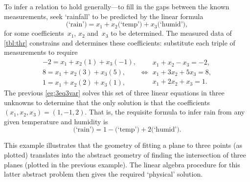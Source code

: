 \begin{example}
\begin{solution} 
To infer a relation to hold generally---to fill in the gaps between the known measurements, seek `rainfall' to be predicted by the linear formula
\begin{equation*}
\text{(`rain')}=x_1+x_2\text{(`temp')}+x_3\text{(`humid')},
\end{equation*}
for some coefficients~\(x_1\), \(x_2\) and~\(x_3\) to be determined.
The measured data of \autoref{tbl:thr} constrains and determines these coefficients:
substitute each triple of measurements to require
\begin{equation*}
\begin{array}{l}
-2=x_1+x_2(1)+x_3(-1),
\\ 8=x_1+x_2(3)+x_3(5),
\\1=x_1+x_2(2)+x_3(1),
\end{array}
\iff
\begin{array}{l}
x_1+x_2-x_3=-2,
\\ x_1+3x_2+5x_3=8,
\\x_1+2x_2+x_3=1.
\end{array}
\end{equation*}
The previous \autoref{eg:3eq3var} solves this set of three linear equations in three unknowns to determine that the only solution is that the coefficients \((x_1,x_2,x_3)=(1,-1,2)\).
That is, the requisite formula to infer rain from any given temperature and humidity is 
\begin{equation*}
\text{(`rain')}=1-\text{(`temp')}+2\text{(`humid')}.
\end{equation*}

This example illustrates that the geometry of fitting a plane to three points (as plotted) translates into the abstract geometry of finding the intersection of three planes (plotted in the previous example).
The linear algebra procedure for this latter abstract problem then gives the required `physical' solution.
\end{solution}
\end{example}


